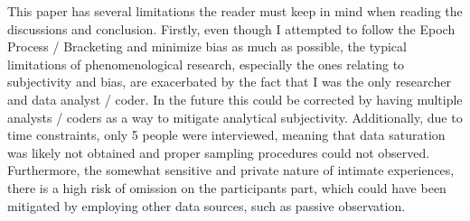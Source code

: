 
This paper has several limitations the reader must keep in mind when reading the discussions and conclusion.
Firstly, even though I attempted to follow the Epoch Process / Bracketing and minimize bias as much as possible, the typical limitations of phenomenological research, especially the ones relating to subjectivity and bias, are exacerbated by the fact that I was the only researcher and data analyst / coder.
In the future this could be corrected by having multiple analysts / coders as a way to mitigate analytical subjectivity.
Additionally, due to time constraints, only 5 people were interviewed, meaning that data saturation was likely not obtained and proper sampling procedures could not observed.
Furthermore, the somewhat sensitive and private nature of intimate experiences, there is a high risk of omission on the participants part, which could have been mitigated by employing other data sources, such as passive observation.